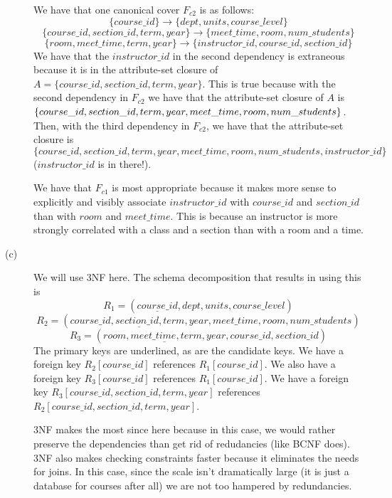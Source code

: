\documentclass{article}
\begin{document}
\begin{description}
        \vspace{3mm}
        We have that one canonical cover $F_{c2}$ is as follows:
        \[ \{ course\_id \} \rightarrow \{ dept, units, course\_level \} \]
        \[ \{ course\_id, section\_id, term, year \} \rightarrow
        \{ meet\_time, room, num\_students \} \]
        \[ \{ room, meet\_time, term, year \} \rightarrow \{ instructor\_id,
        course\_id, section\_id \} \]
        We have that the $instructor\_id$ in the second dependency is extraneous
        because it is in the attribute-set closure of $A = \{course\_id,
        section\_id, term, year \}$. This is true because with the second
        dependency in $F_{c2}$ we have that the attribute-set closure of $A$ is
        $\{course\_id, section\_id, term, year, meet\_time,\\
        room, num\_students\}$.
        Then, with the third dependency in $F_{c2}$, we have that the attribute-set
        closure is
        $\{course\_id, section\_id, term, year, meet\_time, room,
        num\_students, instructor\_id\}$ ($instructor\_id$ is in there!).

        \vspace{3mm}
        We have that $F_{c1}$ is most appropriate because it makes more sense
        to explicitly and visibly associate $instructor\_id$ with $course\_id$ and
        $section\_id$ than with $room$ and $meet\_time$. This is because
        an instructor is more strongly correlated with a class and a section
        than with a room and a time.
    \item[(c)]
        We will use 3NF here. The schema decomposition that results in using
        this is
        \[ R_1 = (\underline{course\_id}, dept, units, course\_level) \]
        \[ R_2 = (\underline{course\_id, section\_id, term, year}, meet\_time,
            room, num\_students) \]
        \[ R_3 = (\underline{room, meet\_time, term, year}, course\_id,
            section\_id) \]
        The primary keys are underlined, as are the candidate keys. We have
        a foreign key $R_2[course\_id]$ references $R_1[course\_id]$.
        We also have a foreign key $R_3[course\_id]$ references $R_1[course\_id]$.
        We have a foreign key $R_3[course\_id, section\_id, term, year]$
        references $R_2[course\_id, section\_id, term, year]$.

        3NF makes the most since here because in this case, we would rather
        preserve the dependencies than get rid of redudancies (like BCNF does).
        3NF also makes checking constraints faster because it eliminates the
        needs for joins. In this case, since the scale isn't dramatically large
        (it is just a database for courses after all) we are not too hampered
        by redundancies.
\end{description}
\end{document}
